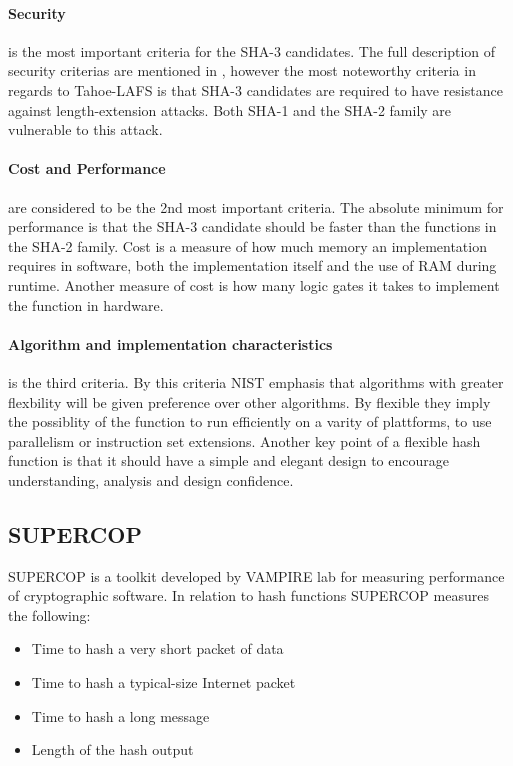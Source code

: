 \documentclass[english,12pt,a4paper]{book}
\begin{document}
\paragraph{Security} is the most important criteria for the SHA-3
candidates\cite{s_nistround2}. The full description of security criterias are
mentioned in \cite{s_fedreg}, however the most noteworthy criteria in regards
to Tahoe-\ac{LAFS} is that \ac{SHA}-3 candidates are required to have
resistance against length-extension attacks. Both \ac{SHA}-1 and the \ac{SHA}-2
family are vulnerable to this attack\cite{s_mdre}.

\paragraph{Cost and Performance} are considered to be the 2nd most important
criteria. The absolute minimum for performance is that the SHA-3 candidate
should be faster than the functions in the \ac{SHA}-2 family. Cost is a measure
of how much memory an implementation requires in software, both the 
implementation itself and the use of \ac{RAM} during runtime. Another measure
of cost is how many logic gates it takes to implement the function in hardware.

\paragraph{Algorithm and implementation characteristics} is the third criteria.
By this criteria \ac{NIST} emphasis that algorithms with greater flexbility
will be given preference over other algorithms\cite{s_nistround2}. By flexible
they imply the possiblity of the function to run efficiently on a varity of
plattforms, to use parallelism or instruction set extensions. Another key point
of a flexible hash function is that it should have a simple and elegant design
to encourage understanding, analysis and design confidence.

\subsection{\ac{SUPERCOP}}
\ac{SUPERCOP} is a toolkit developed by VAMPIRE lab for measuring performance
of cryptographic software\cite{s_supercop}. In relation to hash functions
\ac{SUPERCOP} measures the following:

\begin{itemize}
    \item Time to hash a very short packet of data
    \item Time to hash a typical-size Internet packet
    \item Time to hash a long message
    \item Length of the hash output
\end{itemize}
\end{document}
